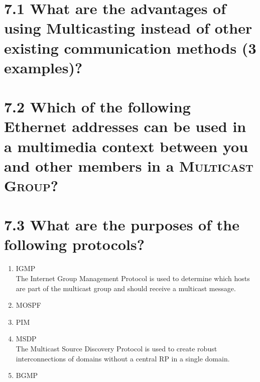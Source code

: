 \documentclass{article}
\begin{document}
	\pagestyle{fancy}
	\hfill
	
	\section*{7.1 What are the advantages of using Multicasting instead of other existing communication methods (3 examples)?}
	\begin{adjustwidth}{2em}{2em}
	\end{adjustwidth}
	
	\section*{7.2 Which of the following Ethernet addresses can be used in a multimedia context between you and other members in a \textsc{Multicast Group}?}
	\begin{adjustwidth}{2em}{2em}
	\end{adjustwidth}
	
	\section*{7.3 What are the purposes of the following protocols?}
	\begin{adjustwidth}{2em}{2em}
		\begin{enumerate}[\small \textbullet]
			\item IGMP \\
			The Internet Group Management Protocol is used to determine which hosts are part of the multicast group and should receive a multicast message.
			\item MOSPF
			\item PIM
			\item MSDP \\
			The Multicast Source Discovery Protocol is used to create robust interconnections of domains without a central RP in a single domain.
			\item BGMP
		\end{enumerate}
	\end{adjustwidth}
	
\end{document}
